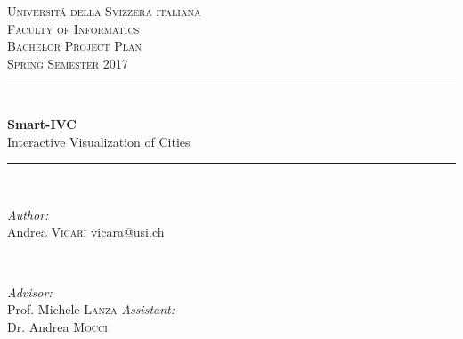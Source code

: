 \documentclass[a4paper]{article}
\begin{document}
\begin{titlepage}

\newcommand{\HRule}{\rule{\linewidth}{0.5mm}} %

\center %
 
\textsc{\LARGE Universit\'a della Svizzera italiana}\\[1.5cm] %
\textsc{\Large Faculty of Informatics}\\[0.5cm] %
\textsc{\large Bachelor Project Plan\\Spring Semester 2017}\\[0.5cm] %


\HRule \\[0.4cm]
{ \Huge \bfseries Smart-IVC}\\[0.4cm] %
{ \huge Interactive Visualization of Cities}
\HRule \\[1.5cm]
 

\begin{minipage}{0.4\textwidth}
\begin{flushleft} \large
\emph{Author:}\\
Andrea \textsc{Vicari} %
vicara@usi.ch %
\end{flushleft}
\end{minipage}
~
\begin{minipage}{0.4\textwidth}
\begin{flushright} \large
\emph{Advisor:} \\
Prof. Michele \textsc{Lanza} %
\emph{Assistant:} \\
Dr. Andrea \textsc{Mocci} %
\end{flushright}
\end{minipage}\\[4cm]


\end{titlepage}
\end{document}
